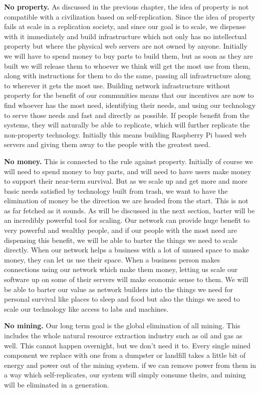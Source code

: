 \textbf{No property.}  As discussed in the previous chapter, the idea of property is not compatible with a civilization based on self-replication.  Since the idea of property fails at scale in a replication society, and since our goal is to scale, we dispense with it immediately and build infrastructure which not only has no intellectual property but where the physical web servers are not owned by anyone.  Initially we will have to spend money to buy parts to build them, but as soon as they are built we will release them to whoever we think will get the most use from them, along with instructions for them to do the same, passing all infrastructure along to wherever it gets the most use.  Building network infrastructure without property for the benefit of our communities means that our incentives are now to find whoever has the most need, identifying their needs, and using our technology to serve those needs and fast and directly as possible.  If people benefit from the systems, they will naturally be able to replicate, which will further replicate the non-property technology.  Initially this means building Raspberry Pi based web servers and giving them away to the people with the greatest need.

\textbf{No money.}  This is connected to the rule against property.  Initially of course we will need to spend money to buy parts, and will need to have users make money to support their near-term survival.  But as we scale up and get more and more basic needs satisfied by technology built from trash, we want to have the elimination of money be the direction we are headed from the start.  This is not as far fetched as it sounds.  As will be discussed in the next section, barter will be an incredibly powerful tool for scaling.  Our network can provide huge benefit to very powerful and wealthy people, and if our people with the most need are dispensing this benefit, we will be able to barter the things we need to scale directly.  When our network helps a business with a lot of unused space to make money, they can let us use their space.  When a business person makes connections using our network which make them money, letting us scale our software up on some of their servers will make economic sense to them.  We will be able to barter our value as network builders into the things we need for personal survival like places to sleep and food but also the things we need to scale our technology like access to labs and machines.

\textbf{No mining.}  Our long term goal is the global elimination of all mining.  This includes the whole natural resource extraction industry such as oil and gas as well.  This cannot happen overnight, but we don't need it to.  Every single mined component we replace with one from a dumpster or landfill takes a little bit of energy and power out of the mining system. if we can remove power from them in a way which self-replicates, our system will simply consume theirs, and mining will be eliminated in a generation.

